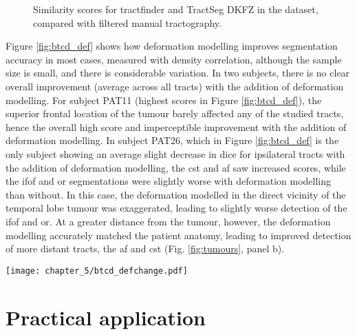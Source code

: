 \documentclass[12pt,phd,a4paper,twoside]{ucl_thesis}
\begin{document}
\begin{figure}[htb!]
  \caption[Similarity scores against tractography for tractfinder and TractSeg in the BTC dataset]{Similarity scores for tractfinder and TractSeg DKFZ in the  dataset, compared with filtered manual tractography.}
  \label{fig:btcd_box}
\end{figure}

Figure \ref{fig:btcd_def} shows how deformation modelling improves segmentation accuracy in most cases, measured with density correlation, although the sample size is small, and there is considerable variation.
In two subjects, there is no clear overall improvement (average across all tracts) with the addition of deformation modelling.
For subject PAT11 (highest scores in Figure \ref{fig:btcd_def}), the superior frontal location of the tumour barely affected any of the studied tracts, hence the overall high score and imperceptible improvement with the addition of deformation modelling.
In subject PAT26, which in Figure \ref{fig:btcd_def} is the only subject showing an average slight decrease in \gls{dice} for ipsilateral tracts with the addition of deformation modelling, the \gls{cst} and \gls{af} saw increased scores, while the \gls{ifof} and \gls{or} segmentations were slightly worse with deformation modelling than without.
In this case, the deformation modelled in the direct vicinity of the temporal lobe tumour was exaggerated, leading to slightly worse detection of the \gls{ifof} and \gls{or}.
At a greater distance from the tumour, however, the deformation modelling accurately matched the patient anatomy, leading to improved detection of more distant tracts, the \gls{af} and \gls{cst} (Fig. \ref{fig:tumours}, panel b).

\begin{SCfigure}[][htb!]
  \texttt{[image: chapter\_5/btcd\_defchange.pdf]}
  \caption[Effect of deformation modelling in the BTC dataset]{Effect of deformation modelling on segmentation accuracy, compared with manually filtered targeted tractography. Each large datapoint represents the average across all tracts for a single subject, and is coloured according to the tumour side. Small datapoints represent individual tracts. In the one subject with a midline tumour, all tracts are considered ipsilateral.}
  \label{fig:btcd_def}
\end{SCfigure}
\clearpage{}
\clearpage{}\chapter{Practical application}
\label{chap:applications}
\end{document}
